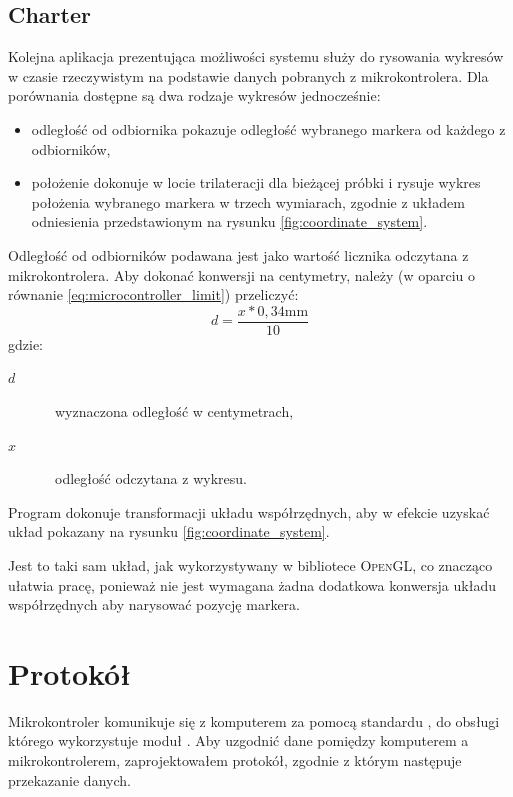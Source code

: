 \subsection{Charter}
Kolejna aplikacja prezentująca możliwości systemu służy do rysowania wykresów w czasie rzeczywistym na podstawie danych pobranych z mikrokontrolera. Dla porównania dostępne są dwa rodzaje wykresów jednocześnie:
\begin{itemize}
 \item odległość od odbiornika \ppauza pokazuje odległość wybranego markera od każdego z odbiorników,
 \item położenie \ppauza dokonuje w locie trilateracji dla bieżącej próbki i rysuje wykres położenia wybranego markera w trzech wymiarach, zgodnie z układem odniesienia przedstawionym na rysunku \ref{fig:coordinate_system}.
\end{itemize}

Odległość od odbiorników podawana jest jako wartość licznika odczytana z mikrokontrolera. Aby dokonać konwersji na centymetry, należy (w oparciu o równanie \ref{eq:microcontroller_limit}) przeliczyć:
\begin{equation}
 d = \frac{x * 0,34\textrm{mm}}{10}
\end{equation}
gdzie:
\begin{description}
 \item[$d$] \ppauza~wyznaczona odległość w centymetrach,
 \item[$x$] \ppauza~odległość odczytana z wykresu.
\end{description}

Program dokonuje transformacji układu współrzędnych, aby w efekcie uzyskać układ pokazany na rysunku \ref{fig:coordinate_system}.

Jest to taki sam układ, jak wykorzystywany w bibliotece \textsc{OpenGL}, co znacząco ułatwia pracę, ponieważ nie jest wymagana żadna dodatkowa konwersja układu współrzędnych aby narysować pozycję markera.

\section{Protokół}
\label{sec:protocol}
Mikrokontroler komunikuje się z komputerem za pomocą standardu , do obsługi którego wykorzystuje moduł . Aby uzgodnić dane pomiędzy komputerem a mikrokontrolerem, zaprojektowałem protokół, zgodnie z którym następuje przekazanie danych.

